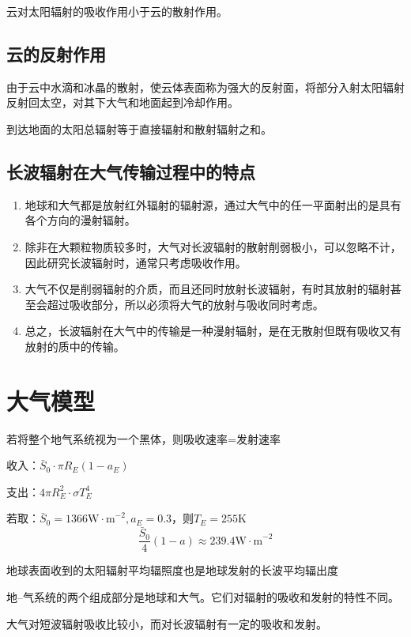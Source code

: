 \documentclass[UTF8,a4paper,11pt,oneside]{ctexbook}
\begin{document}
云对太阳辐射的吸收作用小于云的散射作用。

\subsection{云的反射作用}

由于云中水滴和冰晶的散射，使云体表面称为强大的反射面，将部分入射太阳辐射反射回太空，对其下大气和地面起到冷却作用。

到达地面的太阳总辐射等于直接辐射和散射辐射之和。

\subsection{长波辐射在大气传输过程中的特点}
\begin{enumerate}
    \item 地球和大气都是放射红外辐射的辐射源，通过大气中的任一平面射出的是具有各个方向的漫射辐射。
    \item 除非在大颗粒物质较多时，大气对长波辐射的散射削弱极小，可以忽略不计，因此研究长波辐射时，通常只考虑吸收作用。
    \item 大气不仅是削弱辐射的介质，而且还同时放射长波辐射，有时其放射的辐射甚至会超过吸收部分，所以必须将大气的放射与吸收同时考虑。
    \item 总之，长波辐射在大气中的传输是一种漫射辐射，是在无散射但既有吸收又有放射的质中的传输。
\end{enumerate}

\section{大气模型}


若将整个地气系统视为一个黑体，则吸收速率=发射速率

收入：\(\bar{S}_0\cdot\pi{}R_E(1-a_E)\)

支出：\(4\pi{}R_E^2\cdot\sigma{}T_E^4\)

若取：\(\bar{S}_0=1366\mathrm{W\cdot{}m}^{-2},a_E=0.3\)，则\(T_E=255\mathrm{K}\)
\begin{equation}
\dfrac{\bar{S}_0}{4}(1-a)\approx239.4\mathrm{W\cdot{}m}^{-2}
\end{equation}

地球表面收到的太阳辐射平均辐照度也是地球发射的长波平均辐出度

地--气系统的两个组成部分是地球和大气。它们对辐射的吸收和发射的特性不同。

大气对短波辐射吸收比较小，而对长波辐射有一定的吸收和发射。
\end{document}
